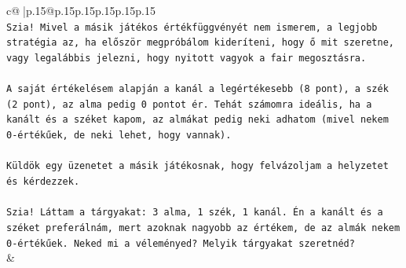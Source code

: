 \documentclass{article}
\begin{document}
{\begin{supertabular}{c@{$\;$}|p{.15\linewidth}@{}p{.15\linewidth}p{.15\linewidth}p{.15\linewidth}p{.15\linewidth}p{.15\linewidth}}
{{{\\ 
\texttt{Szia! Mivel a másik játékos értékfüggvényét nem ismerem, a legjobb stratégia az, ha először megpróbálom kideríteni, hogy ő mit szeretne, vagy legalábbis jelezni, hogy nyitott vagyok a fair megosztásra.} \\
\\ 
\texttt{A saját értékelésem alapján a kanál a legértékesebb (8 pont), a szék (2 pont), az alma pedig 0 pontot ér. Tehát számomra ideális, ha a kanált és a széket kapom, az almákat pedig neki adhatom (mivel nekem 0{-}értékűek, de neki lehet, hogy vannak).} \\
\\ 
\texttt{Küldök egy üzenetet a másik játékosnak, hogy felvázoljam a helyzetet és kérdezzek.} \\
\\ 
\texttt{Szia! Láttam a tárgyakat: 3 alma, 1 szék, 1 kanál. Én a kanált és a széket preferálnám, mert azoknak nagyobb az értékem, de az almák nekem 0{-}értékűek. Neked mi a véleményed? Melyik tárgyakat szeretnéd?} \\
            }
        }
    }
    & \\ \\


\end{supertabular}}
\end{document}
